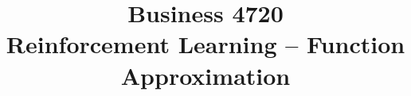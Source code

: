 \documentclass{article}
\title{Business 4720\\ \vspace{\baselineskip}
Reinforcement Learning -- Function Approximation}
\begin{document}
\maketitle

\vfill

\clearpage


\end{document}
